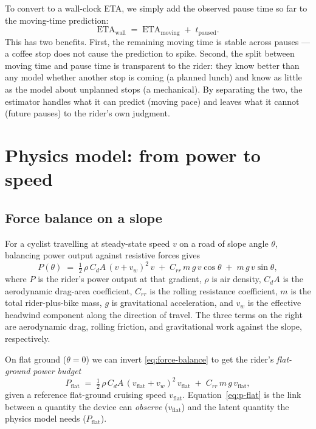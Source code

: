 \documentclass[11pt,a4paper]{article}
\begin{document}
To convert to a wall-clock ETA, we simply add the observed pause
time so far to the moving-time prediction:
\begin{equation}
\text{ETA}_{\text{wall}} \;=\;
  \text{ETA}_{\text{moving}} \;+\; t_{\text{paused}}.
\end{equation}
This has two benefits. First, the remaining moving time is stable
across pauses --- a coffee stop does not cause the prediction to
spike. Second, the split between moving time and pause time is
transparent to the rider: they know better than any model whether
another stop is coming (a planned lunch) and know as little as the
model about unplanned stops (a mechanical). By separating the two,
the estimator handles what it can predict (moving pace) and leaves
what it cannot (future pauses) to the rider's own judgment.


\section{Physics model: from power to speed}

\subsection{Force balance on a slope}

For a cyclist travelling at steady-state speed $v$ on a road of slope
angle $\theta$, balancing power output against resistive forces gives
\begin{equation}
\label{eq:force-balance}
P(\theta) \;=\; \tfrac{1}{2}\,\rho\,C_d A\,(v + v_w)^2\,v
              \;+\; C_{rr}\,m\,g\,v\cos\theta
              \;+\; m\,g\,v\sin\theta,
\end{equation}
where $P$ is the rider's power output at that gradient, $\rho$ is air
density, $C_dA$ is the aerodynamic drag-area coefficient, $C_{rr}$ is
the rolling resistance coefficient, $m$ is the total rider-plus-bike
mass, $g$ is gravitational acceleration, and $v_w$ is the effective
headwind component along the direction of travel. The three terms on
the right are aerodynamic drag, rolling friction, and gravitational
work against the slope, respectively.

On flat ground ($\theta = 0$) we can invert
\eqref{eq:force-balance} to get the rider's \emph{flat-ground power
budget}
\begin{equation}
\label{eq:p-flat}
P_{\text{flat}} \;=\; \tfrac{1}{2}\,\rho\,C_d A\,(v_{\text{flat}} + v_w)^2\,v_{\text{flat}}
                 \;+\; C_{rr}\,m\,g\,v_{\text{flat}},
\end{equation}
given a reference flat-ground cruising speed $v_{\text{flat}}$.
Equation~\eqref{eq:p-flat} is the link between a quantity the device
can \emph{observe} ($v_{\text{flat}}$) and the latent quantity the
physics model needs ($P_{\text{flat}}$).
\end{document}
